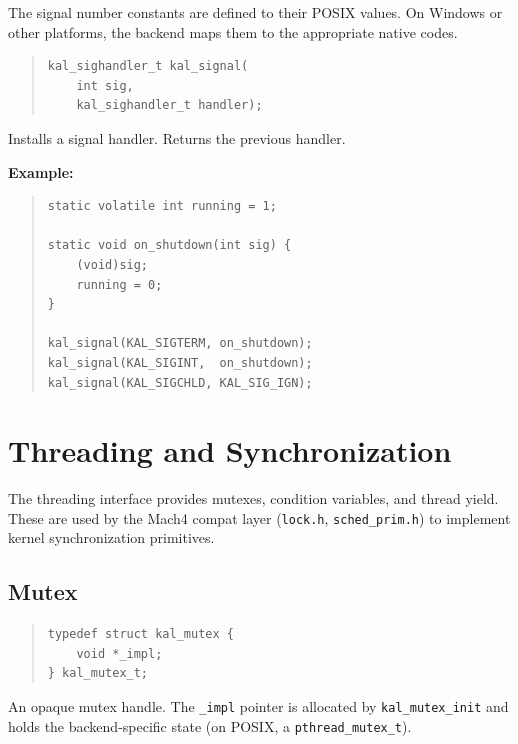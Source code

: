 \documentclass[11pt,twoside]{article}
\begin{document}
The signal number constants are defined to their POSIX values.
On Windows or other platforms, the backend maps them to the
appropriate native codes.

\begin{quote}
\begin{verbatim}
kal_sighandler_t kal_signal(
    int sig,
    kal_sighandler_t handler);
\end{verbatim}
\end{quote}

Installs a signal handler.  Returns the previous handler.

\medskip
\noindent
{\bf Example:}
\begin{quote}
\begin{verbatim}
static volatile int running = 1;

static void on_shutdown(int sig) {
    (void)sig;
    running = 0;
}

kal_signal(KAL_SIGTERM, on_shutdown);
kal_signal(KAL_SIGINT,  on_shutdown);
kal_signal(KAL_SIGCHLD, KAL_SIG_IGN);
\end{verbatim}
\end{quote}

\newpage
\section{Threading and Synchronization}
\label{sec:thread}

The threading interface provides mutexes, condition variables, and
thread yield.  These are used by the Mach4 compat layer
({\tt lock.h}, {\tt sched\_prim.h}) to implement kernel
synchronization primitives.

\subsection{Mutex}

\begin{quote}
\begin{verbatim}
typedef struct kal_mutex {
    void *_impl;
} kal_mutex_t;
\end{verbatim}
\end{quote}

An opaque mutex handle.  The {\tt \_impl} pointer is
allocated by {\tt kal\_mutex\_init} and holds the
backend-specific state (on POSIX, a {\tt pthread\_mutex\_t}).
\end{document}
